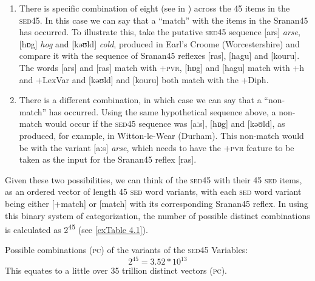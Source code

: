 \begin{enumerate}
\item{There is specific combination of eight  (see  in ) across the 45 items in the \textsc{sed45}. In this case we can say that a ``match'' with the items in the Sranan45 has occurred. To illustrate this, take the putative \textsc{sed45} sequence [ars] \emph{arse}, [hɒg] \emph{hog} and [kəʊld] \emph{cold}, produced in Earl's Croome (Worcestershire) and compare it with the sequence of Sranan45  reflexes [ras], [hagu] and [kouru]. The words [ars] and [ras] match with +\textsc{pvr}, [hɒg] and [hagu] match with +h and +LexVar and [kəʊld] and [kouru] both match with the +Diph.}
\item{There is a different combination, in which case we can say that a ``non-match'' has occurred. Using the same hypothetical sequence above, a non-match would occur if the \textsc{sed45}  sequence was [aːs], [hɒg] and [kəʊld], as produced, for example, in Witton-le-Wear (Durham). This non-match would be with the variant [aːs] \emph{arse}, which needs to have the +\textsc{pvr} feature to be taken as the input  for the Sranan45  reflex [ras].}
\end{enumerate}

Given these two possibilities, we can think of the \textsc{sed45} with their 45 \textsc{sed} items, as an ordered vector of length 45 \textsc{sed} word variants, with each \textsc{sed} word variant being either [+match] or [\textminus{}match] with its corresponding Sranan45 reflex. In using this binary system of categorization, the number of possible distinct combinations is calculated as 2\textsuperscript{45} (see \ref{exTable 4.1}).

\ea
\label{exTable 4.1}
{Possible combinations (\textsc{pc}) of the variants of the \textsc{sed45} Variables}:\\
\[2^{45} = 3.52 \ast 10^{13}\]
This equates to a little over 35 trillion distinct vectors (\textsc{pc}). \\  
\z

